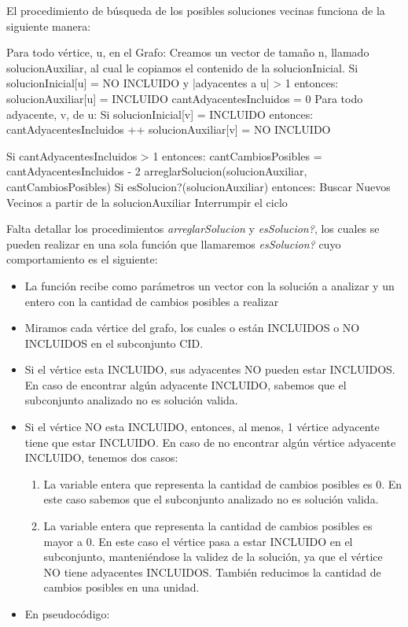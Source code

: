 El procedimiento de búsqueda de los posibles soluciones vecinas funciona de la siguiente manera:
\medskip

\begin{codesnippet}
Para todo vértice, u, en el Grafo:
  Creamos un vector de tamaño n, llamado solucionAuxiliar, al cual le copiamos
  el contenido de la solucionInicial.
  Si solucionInicial[u] = NO INCLUIDO y |adyacentes a u| > 1 entonces:
     solucionAuxiliar[u] = INCLUIDO
     cantAdyacentesIncluidos = 0
     Para todo adyacente, v, de u:
         Si solucionInicial[v] = INCLUIDO entonces:
             cantAdyacentesIncluidos ++
             solucionAuxiliar[v] = NO INCLUIDO

  Si cantAdyacentesIncluidos > 1 entonces:
     cantCambiosPosibles = cantAdyacentesIncluidos - 2
     arreglarSolucion(solucionAuxiliar, cantCambiosPosibles)
     Si esSolucion?(solucionAuxiliar) entonces:
       Buscar Nuevos Vecinos a partir de la solucionAuxiliar
       Interrumpir el ciclo
\end{codesnippet}

Falta detallar los procedimientos \textit{arreglarSolucion} y \textit{esSolucion?}, los cuales se pueden realizar en una sola función que llamaremos \textit{esSolucion?} cuyo comportamiento es el siguiente:
\begin{itemize}
	\item La función recibe como parámetros un vector con la solución a analizar y un entero con la cantidad de cambios posibles a realizar
	\item Miramos cada vértice del grafo, los cuales o están INCLUIDOS o NO INCLUIDOS en el subconjunto CID.
    \item Si el vértice esta INCLUIDO, sus adyacentes NO pueden estar INCLUIDOS. En caso de encontrar algún adyacente INCLUIDO, sabemos que el subconjunto analizado no es solución valida.
    \item Si el vértice NO esta INCLUIDO, entonces, al menos, 1 vértice adyacente tiene que estar INCLUIDO. En caso de no encontrar algún vértice adyacente INCLUIDO, tenemos dos casos:
    \begin{enumerate}
    	\item La variable entera que representa la cantidad de cambios posibles es 0. En este caso sabemos que el subconjunto analizado no es solución valida.
        \item La variable entera que representa la cantidad de cambios posibles es mayor a 0. En este caso el vértice pasa a estar INCLUIDO en el subconjunto, manteniéndose la validez de la solución, ya que el vértice NO tiene adyacentes INCLUIDOS. También reducimos la cantidad de cambios posibles en una unidad.
    \end{enumerate}

    \item En pseudocódigo:

\end{itemize}

